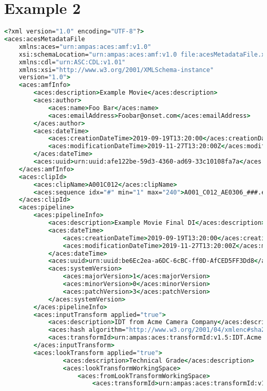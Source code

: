 \section*{Example 2}
\begin{lstlisting}[language=csh]
<?xml version="1.0" encoding="UTF-8"?>
<aces:acesMetadataFile 
    xmlns:aces="urn:ampas:aces:amf:v1.0"
    xsi:schemaLocation="urn:ampas:aces:amf:v1.0 file:acesMetadataFile.xsd"
    xmlns:cdl="urn:ASC:CDL:v1.01"
    xmlns:xsi="http://www.w3.org/2001/XMLSchema-instance"
    version="1.0">
    <aces:amfInfo>
        <aces:description>Example Movie</aces:description>
        <aces:author>
            <aces:name>Foo Bar</aces:name>
            <aces:emailAddress>Foobar@onset.com</aces:emailAddress>
        </aces:author>
        <aces:dateTime>
            <aces:creationDateTime>2019-09-19T13:20:00</aces:creationDateTime>
            <aces:modificationDateTime>2019-11-27T13:20:00Z</aces:modificationDateTime>
        </aces:dateTime>
        <aces:uuid>urn:uuid:afe122be-59d3-4360-ad69-33c10108fa7a</aces:uuid>
    </aces:amfInfo>
    <aces:clipId>
        <aces:clipName>A001C012</aces:clipName>
        <aces:sequence idx="#" min="1" max="240">A001_C012_AE0306_###.exr</aces:sequence>
    </aces:clipId>
    <aces:pipeline>
        <aces:pipelineInfo>
            <aces:description>Example Movie Final DI</aces:description>
            <aces:dateTime>
                <aces:creationDateTime>2019-09-19T13:20:00</aces:creationDateTime>
                <aces:modificationDateTime>2019-11-27T13:20:00Z</aces:modificationDateTime>
            </aces:dateTime>
            <aces:uuid>urn:uuid:be6Ec2ea-a6DC-6cBC-ff0D-AfCED5FF3Dd8</aces:uuid>
            <aces:systemVersion>
                <aces:majorVersion>1</aces:majorVersion>
                <aces:minorVersion>0</aces:minorVersion>
                <aces:patchVersion>3</aces:patchVersion>
            </aces:systemVersion>
        </aces:pipelineInfo>
        <aces:inputTransform applied="true">
            <aces:description>IDT from Acme Camera Company</aces:description>
            <aces:hash algorithm="http://www.w3.org/2001/04/xmlenc#sha256">1531ea6ef06c5b0a5bea80c94f60c7b68e3989e3c90b8ebd25c28aa4670c30f8</aces:hash>
            <aces:transformId>urn:ampas:aces:transformId:v1.5:IDT.Acme.Camera.a1.v1</aces:transformId>
        </aces:inputTransform>
        <aces:lookTransform applied="true">
                <aces:description>Technical Grade</aces:description>
                <aces:lookTransformWorkingSpace>
                    <aces:fromLookTransformWorkingSpace>
                        <aces:transformId>urn:ampas:aces:transformId:v1.5:ACEScsc.Academy.ACEScct_to_ACES.a1.0.3</aces:transformId>

\end{lstlisting}
